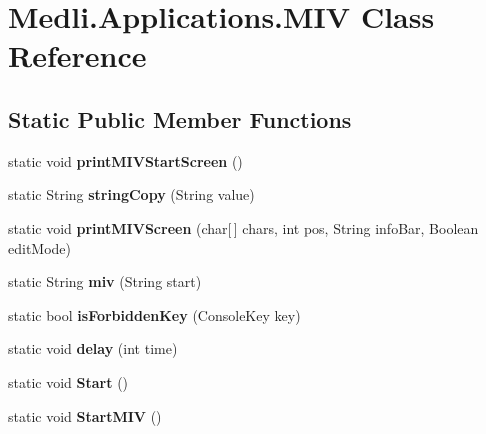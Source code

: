 \hypertarget{class_medli_1_1_applications_1_1_m_i_v}{}\section{Medli.\+Applications.\+M\+IV Class Reference}
\label{class_medli_1_1_applications_1_1_m_i_v}
\subsection*{Static Public Member Functions}
\begin{DoxyCompactItemize}
\item 
\mbox{\label{class_medli_1_1_applications_1_1_m_i_v_a30091a32b8738ebf5275d41aff22497a}} 
static void {\bfseries print\+M\+I\+V\+Start\+Screen} ()
\item 
\mbox{\label{class_medli_1_1_applications_1_1_m_i_v_a45af92cbbd57ffaaeffd3c2782d3cbdc}} 
static String {\bfseries string\+Copy} (String value)
\item 
\mbox{\label{class_medli_1_1_applications_1_1_m_i_v_a8a17d64a644796527cde910ad9c6e7cf}} 
static void {\bfseries print\+M\+I\+V\+Screen} (char\mbox{[}$\,$\mbox{]} chars, int pos, String info\+Bar, Boolean edit\+Mode)
\item 
\mbox{\label{class_medli_1_1_applications_1_1_m_i_v_a9bbf6523e60842169c86142c7bcf88c3}} 
static String {\bfseries miv} (String start)
\item 
\mbox{\label{class_medli_1_1_applications_1_1_m_i_v_a87f1516e9d3bd76945bc8de655cc737a}} 
static bool {\bfseries is\+Forbidden\+Key} (Console\+Key key)
\item 
\mbox{\label{class_medli_1_1_applications_1_1_m_i_v_a684f75e0b704aa0c767f2c67e4540bdd}} 
static void {\bfseries delay} (int time)
\item 
\mbox{\label{class_medli_1_1_applications_1_1_m_i_v_a876e92768fe03582a01cf19e00339ef6}} 
static void {\bfseries Start} ()
\item 
\mbox{\label{class_medli_1_1_applications_1_1_m_i_v_a6f84b3a848caf1dfe5b2ca87c47182ca}} 
static void {\bfseries Start\+M\+IV} ()
\end{DoxyCompactItemize}
